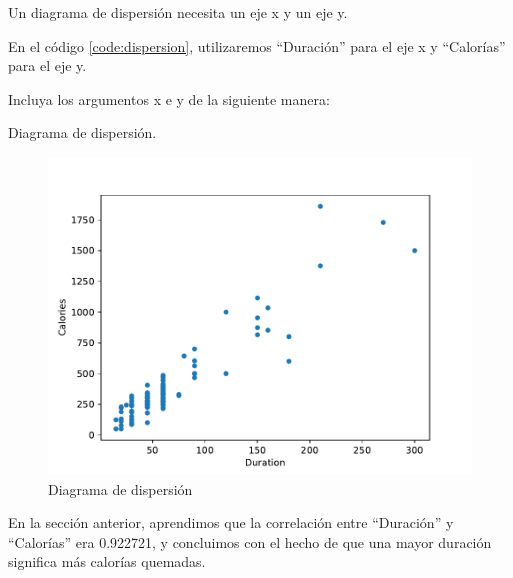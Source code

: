 Un diagrama de dispersión necesita un eje x y un eje y.

En el código \ref{code:dispersion}, utilizaremos ``Duración'' para el eje x y ``Calorías'' para el eje y.

Incluya los argumentos x e y de la siguiente manera:

\begin{Shaded}
  \begin{Highlighting}[]
    \OperatorTok{=} \OperatorTok{=} 

  \end{Highlighting}
\end{Shaded}


\begin{code} Diagrama de dispersión.

\begin{Shaded}
\begin{Highlighting}[]

\OperatorTok{=}\NormalTok{)}

\OperatorTok{=} \OperatorTok{=} \OperatorTok{=} \NormalTok{)}

\end{Highlighting}
\end{Shaded}

\begin{figure}[H]
  \centering
  \includegraphics[scale=0.75]{img/grafica902.pdf}
  \caption{Diagrama de dispersión}
\end{figure}
\label{code:dispersion}
\end{code}
En la sección anterior, aprendimos que la correlación entre ``Duración'' y
``Calorías'' era 0.922721, y concluimos con el hecho de que una mayor
duración significa más calorías quemadas.

